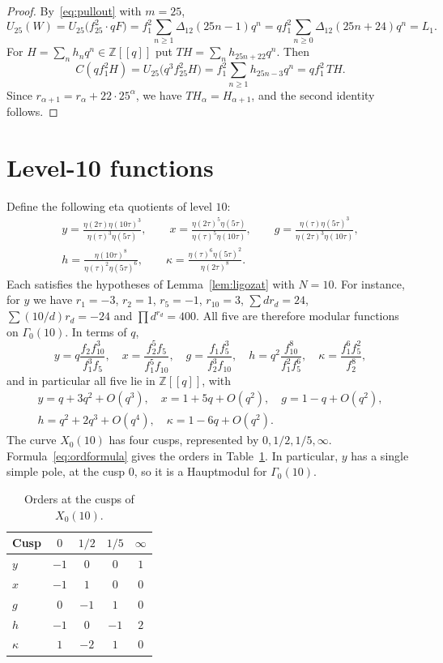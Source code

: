 \documentclass[11pt]{article}
\theoremstyle{definition}
\theoremstyle{remark}
\numberwithin{equation}{section}
\newcommand{\Z}{\mathbb{Z}}
\begin{document}
\begin{proof}
By~\eqref{eq:pullout} with $m=25$,
\[
U_{25}(W)=U_{25}\bigl(f_{25}^2\cdot qF\bigr)=f_1^2\sum_{n\ge1}\Delta_{12}(25n-1)q^n=qf_1^2\sum_{n\ge0}\Delta_{12}(25n+24)q^n=L_1.
\]
For $H=\sum_nh_nq^n\in\Z[[q]]$ put $TH=\sum_nh_{25n+22}q^n$. Then
\[
C(qf_1^2H)=U_{25}\bigl(q^3f_{25}^2H\bigr)=f_1^2\sum_{n\ge1}h_{25n-3}q^n=qf_1^2\,TH.
\]
Since $r_{\alpha+1}=r_\alpha+22\cdot25^\alpha$, we have $TH_\alpha=H_{\alpha+1}$, and the second identity follows.
\end{proof}

\section{Level-10 functions}\label{sec:level10}

Define the following eta quotients of level $10$:
\begin{gather*}
y=\frac{\eta(2\tau)\eta(10\tau)^3}{\eta(\tau)^3\eta(5\tau)},\qquad
x=\frac{\eta(2\tau)^5\eta(5\tau)}{\eta(\tau)^5\eta(10\tau)},\qquad
g=\frac{\eta(\tau)\eta(5\tau)^3}{\eta(2\tau)^3\eta(10\tau)},\\
h=\frac{\eta(10\tau)^8}{\eta(\tau)^2\eta(5\tau)^6},\qquad
\kappa=\frac{\eta(\tau)^6\eta(5\tau)^2}{\eta(2\tau)^8}.
\end{gather*}
Each satisfies the hypotheses of Lemma~\ref{lem:ligozat} with $N=10$. For instance, for $y$ we have $r_1=-3$, $r_2=1$, $r_5=-1$, $r_{10}=3$, $\sum dr_d=24$, $\sum(10/d)r_d=-24$ and $\prod d^{r_d}=400$. All five are therefore modular functions on $\Gamma_0(10)$. In terms of $q$,
\[
y=q\frac{f_2f_{10}^3}{f_1^3f_5},\quad x=\frac{f_2^5f_5}{f_1^5f_{10}},\quad g=\frac{f_1f_5^3}{f_2^3f_{10}},\quad h=q^2\frac{f_{10}^8}{f_1^2f_5^6},\quad \kappa=\frac{f_1^6f_5^2}{f_2^8},
\]
and in particular all five lie in $\Z[[q]]$, with
\begin{equation}\label{eq:expansions}
\begin{gathered}
y=q+3q^2+O(q^3),\quad x=1+5q+O(q^2),\quad g=1-q+O(q^2),\\
h=q^2+2q^3+O(q^4),\quad \kappa=1-6q+O(q^2).
\end{gathered}
\end{equation}
The curve $X_0(10)$ has four cusps, represented by $0,1/2,1/5,\infty$. Formula~\eqref{eq:ordformula} gives the orders in Table~\ref{tab:cusps}. In particular, $y$ has a single simple pole, at the cusp $0$, so it is a Hauptmodul for $\Gamma_0(10)$.

\begin{table}[ht]
\centering
\caption{Orders at the cusps of $X_0(10)$.}\label{tab:cusps}
\begin{tabular}{lcccc}
\toprule
Cusp & $0$ & $1/2$ & $1/5$ & $\infty$\\
\midrule
$y$ & $-1$ & $0$ & $0$ & $1$\\
$x$ & $-1$ & $1$ & $0$ & $0$\\
$g$ & $0$ & $-1$ & $1$ & $0$\\
$h$ & $-1$ & $0$ & $-1$ & $2$\\
$\kappa$ & $1$ & $-2$ & $1$ & $0$\\
\bottomrule
\end{tabular}
\end{table}
\end{document}

